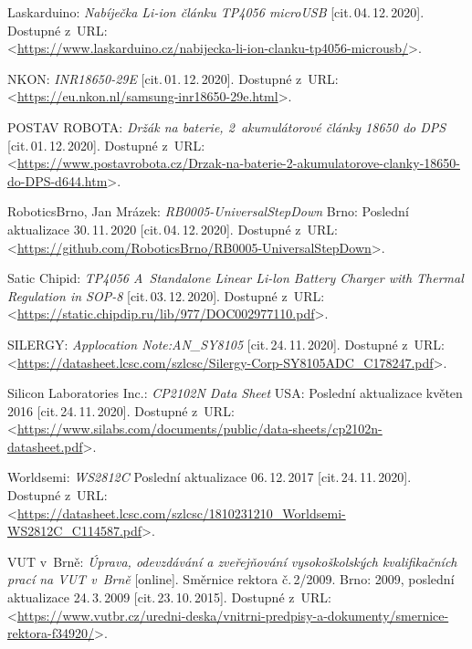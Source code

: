 \begin{thebibliography}{99}
    Laskarduino:
    \emph{Nabíječka Li-ion článku TP4056 microUSB}
    [cit.\,04.\,12.\,2020].
    Dostupné z~URL:\\
    <\url{https://www.laskarduino.cz/nabijecka-li-ion-clanku-tp4056-microusb/}>.

    NKON:
    \emph{INR18650-29E}
    [cit.\,01.\,12.\,2020].
    Dostupné z~URL:\\
    <\url{https://eu.nkon.nl/samsung-inr18650-29e.html}>.

    POSTAV ROBOTA:
    \emph{Držák na baterie, 2~akumulátorové články 18650 do DPS}
    [cit.\,01.\,12.\,2020].
    Dostupné z~URL:\\
    <\url{https://www.postavrobota.cz/Drzak-na-baterie-2-akumulatorove-clanky-18650-do-DPS-d644.htm}>.

    RoboticsBrno, Jan Mrázek:
    \emph{RB0005-UniversalStepDown}
    Brno: Poslední aktualizace 30.\,11.\,2020 [cit.\,04.\,12.\,2020].
    Dostupné z~URL:\\
    <\url{https://github.com/RoboticsBrno/RB0005-UniversalStepDown}>.

    Satic Chipid:
    \emph{TP4056 A~Standalone Linear Li-lon Battery Charger with Thermal Regulation in SOP-8 }
    [cit.\,03.\,12.\,2020].
    Dostupné z~URL:\\
    <\url{https://static.chipdip.ru/lib/977/DOC002977110.pdf}>.

    SILERGY:
    \emph{Applocation Note:AN\_SY8105}
    [cit.\,24.\,11.\,2020].
    Dostupné z~URL:\\
    <\url{https://datasheet.lcsc.com/szlcsc/Silergy-Corp-SY8105ADC_C178247.pdf}>.

    Silicon Laboratories Inc.:
    \emph{CP2102N Data Sheet}
    USA: Poslední aktualizace květen 2016 [cit.\,24.\,11.\,2020].
    Dostupné z~URL:\\
    <\url{https://www.silabs.com/documents/public/data-sheets/cp2102n-datasheet.pdf}>.

    Worldsemi:
    \emph{WS2812C}
    Poslední aktualizace 06.\,12.\,2017 [cit.\,24.\,11.\,2020].
    Dostupné z~URL:\\
    <\url{https://datasheet.lcsc.com/szlcsc/1810231210_Worldsemi-WS2812C_C114587.pdf}>.

		VUT v~Brně:
    \emph{Úprava, odevzdávání a zveřejňování vysokoškolských kva\-li\-fi\-kač\-ních prací na VUT v~Brně}\/ [online].
		Směrnice rektora č.\,2/2009.
		Brno: 2009, po\-sled\-ní aktualizace 24.\,3.\,2009 [cit.\,23.\,10.\,2015].
    Dostupné z~URL:\\
    <\url{https://www.vutbr.cz/uredni-deska/vnitrni-predpisy-a-dokumenty/smernice-rektora-f34920/}>.


\end{thebibliography}
